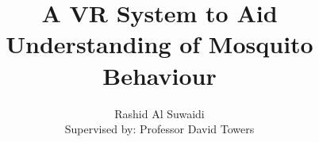 \documentclass[a4paper,12pt,twoside]{report}
\begin{document}
\title{\LARGE {\bf A VR System to Aid Understanding of Mosquito Behaviour}\\
 \vspace*{6mm}
}

\author{Rashid Al Suwaidi  \\{\small Supervised by: Professor David Towers}}
\submitdate{\today}

\normallinespacing
\maketitle

%
%
%
%

\body
%
%


%

\appendix





\end{document}
